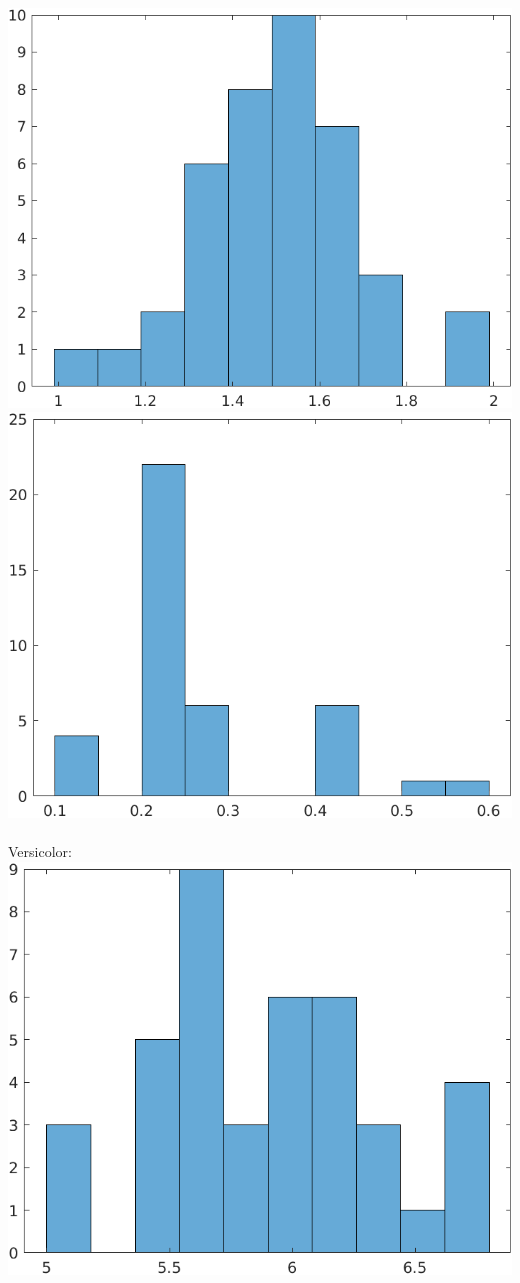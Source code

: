 \documentclass[a4paper]{scrartcl}
\begin{document}
\begin{itemize}
		\includegraphics*[scale=0.2]{assignment2_data/plots/setosa_pb.png}
		\includegraphics*[scale=0.2]{assignment2_data/plots/setosa_bp.png}\\ \ \\
		Versicolor:\\
		\includegraphics*[scale=0.2]{assignment2_data/plots/versicolor_sl.png}

\end{itemize}
\end{document}
